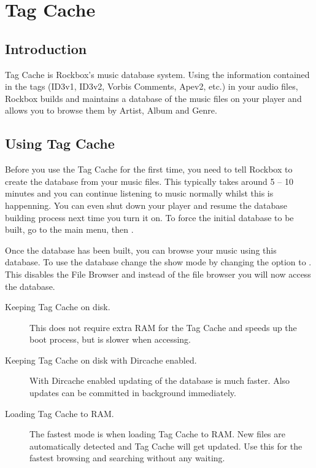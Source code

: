 \section{Tag Cache\label{ref:tagcache}} 

\subsection{Introduction}
Tag Cache is Rockbox's music database system. Using the information 
contained in the tags (ID3v1, ID3v2, Vorbis Comments, Apev2, etc.) in your 
audio files, Rockbox builds and maintains a database of the music files on 
your player and allows you to browse them by Artist, Album and Genre.

\subsection{Using Tag Cache}
Before you use the Tag Cache for the first time, you need to tell Rockbox to
create the database from your music files. This typically takes around 
5 -- 10 minutes and you can continue listening to music normally whilst 
this is happenning. You can even shut down your player and resume the 
database building process next time you turn it on.
To force the initial database to be built, go to the main menu, then 
  .
  
  Once the database has been built, you can browse your music using this 
  database. To use the database change the show mode by changing the 
   option to 
	. This disables the File Browser and instead of the file
	browser you will now access the database.
%
\begin{description}
\item[Keeping Tag Cache on disk.] This does not require extra RAM for the
Tag Cache and speeds up the boot process, but is slower when accessing.
\item[Keeping Tag Cache on disk with Dircache enabled.] With Dircache
enabled updating of the database is much faster. Also updates can be
committed in background immediately.
\item[Loading Tag Cache to RAM.] The fastest mode is when loading Tag Cache
to RAM. New files are automatically detected and Tag Cache will get updated.
Use this for the fastest browsing and searching without any waiting.
\end{description}

